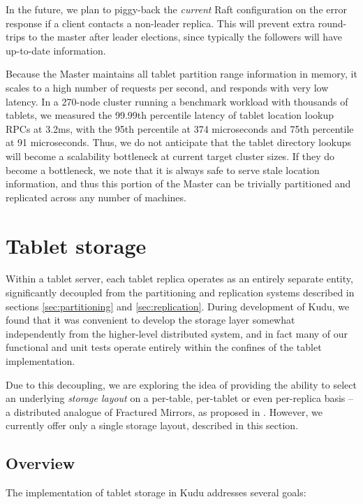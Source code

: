 \documentclass[twocolumn,9pt]{article}
\begin{document}
In the future, we plan to piggy-back the {\em current} Raft configuration on the error response
if a client contacts a non-leader replica. This will prevent extra round-trips to the
master after leader elections, since typically the followers will have up-to-date information.

Because the Master maintains all tablet partition range information in memory, it scales
to a high number of requests per second, and responds with very low latency. In a 270-node
cluster running a benchmark workload with thousands of tablets, we measured the 99.99th percentile
latency of tablet location lookup RPCs at 3.2ms, with the 95th percentile at 374 microseconds
and 75th percentile at 91 microseconds. Thus, we do not anticipate that the tablet directory
lookups will become a scalability bottleneck at current target cluster sizes. If they do become a
bottleneck, we note that it is always safe to serve stale location information, and thus this
portion of the Master can be trivially partitioned and replicated across any number of machines.

\section{Tablet storage}
\label{sec:storage}

Within a tablet server, each tablet replica operates as an entirely separate entity,
significantly decoupled from the partitioning and replication systems described in
sections \ref{sec:partitioning} and \ref{sec:replication}. During development of
Kudu, we found that it was convenient to develop the storage layer somewhat independently
from the higher-level distributed system, and in fact many of our functional and unit
tests operate entirely within the confines of the tablet implementation.

Due to this decoupling, we are exploring the idea of providing the ability to select
an underlying {\em storage layout} on a per-table, per-tablet or even per-replica basis -- a distributed analogue
of Fractured Mirrors, as proposed in \cite{fractured_mirrors}. However, we currently
offer only a single storage layout, described in this section.

\subsection{Overview}

The implementation of tablet storage in Kudu addresses several goals:
\end{document}

